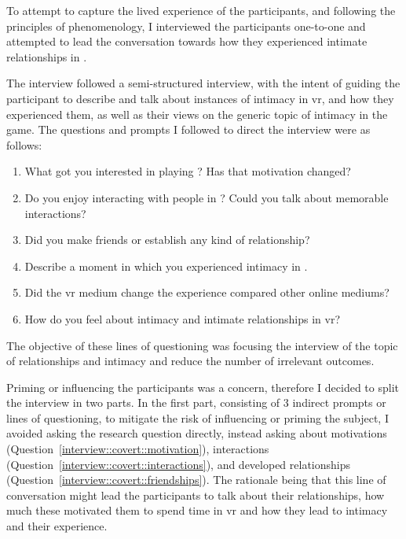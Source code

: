 
To attempt to capture the lived experience of the participants, and following the principles of phenomenology, I interviewed the participants one-to-one and attempted to lead the conversation towards how they experienced intimate relationships in \vrc.

The interview followed a semi-structured interview, with the intent of guiding the participant to describe and talk about instances of intimacy in \gls{vr}, and how they experienced them, as well as their views on the generic topic of intimacy in the game. The questions and prompts I followed to direct the interview were as follows:
\begin{enumerate}
	\item\label{interview::covert::motivation} What got you interested in playing \vrc? Has that motivation changed?
	\item\label{interview::covert::interactions} Do you enjoy interacting with people in \vrc? Could you talk about memorable interactions? 
	\item\label{interview::covert::friendships} Did you make friends or establish any kind of relationship?
	\item\label{interview::overt::descibemoment} Describe a moment in which you experienced intimacy in \vrc.
	\item\label{interview::overt::vrvsonline} Did the \gls{vr} medium change the experience compared other online mediums? 
	\item\label{interview::overt::feelaboutintimacy} How do you feel about intimacy and intimate relationships in \gls{vr}?
\end{enumerate}

The objective of these lines of questioning was focusing the interview of the topic of relationships and intimacy and reduce the number of irrelevant outcomes.

Priming or influencing the participants was a concern, therefore I decided to split the interview in two parts.
In the first part, consisting of $3$ indirect prompts or lines of questioning, to mitigate the risk of influencing or priming the subject, I avoided asking the research question directly, instead asking about motivations (Question~\ref{interview::covert::motivation}), interactions (Question~\ref{interview::covert::interactions}), and developed relationships (Question~\ref{interview::covert::friendships}).
The rationale being that this line of conversation might lead the participants to talk about their relationships, how much these motivated them to spend time in \gls{vr} and how they lead to intimacy and their experience.

